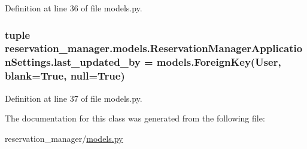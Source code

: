 Definition at line 36 of file models.\-py.

\hypertarget{classreservation__manager_1_1models_1_1ReservationManagerApplicationSettings_a4ea13db7d9bad10f39115cb98342d534}{
\subsubsection[{last\-\_\-updated\-\_\-by}]{\setlength{\rightskip}{0pt plus 5cm}tuple reservation\-\_\-manager.\-models.\-Reservation\-Manager\-Application\-Settings.\-last\-\_\-updated\-\_\-by = models.\-Foreign\-Key(User, blank=True, null=True)\hspace{0.3cm}{\ttfamily [static]}}}\label{classreservation__manager_1_1models_1_1ReservationManagerApplicationSettings_a4ea13db7d9bad10f39115cb98342d534}


Definition at line 37 of file models.\-py.



The documentation for this class was generated from the following file\-:\begin{DoxyCompactItemize}
\item 
reservation\-\_\-manager/\hyperlink{reservation__manager_2models_8py}{models.\-py}\end{DoxyCompactItemize}
